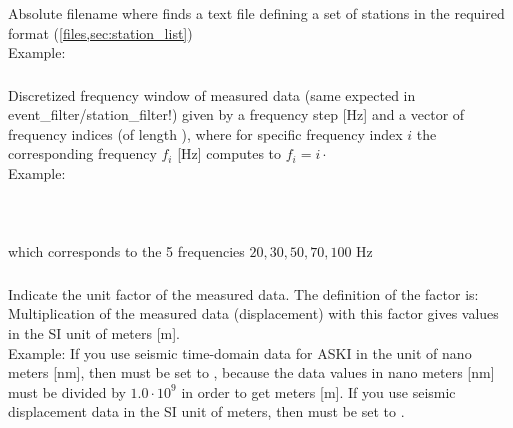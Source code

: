 \subsubsection{} \label{files,sec:main_parfile,itm:file_station_list}
Absolute filename where \ASKI finds a text file defining a set of stations in the required format 
(\ref{files,sec:station_list})\\
Example: 
\subsubsection{} 
\label{files,sec:main_parfile,itm:mdata_freq}
Discretized frequency window of measured data (same expected in event\_filter/station\_filter!) given by a frequency 
step  [Hz] and a vector of frequency indices 
(of length ), where for specific frequency index $i$ the corresponding frequency $f_i$ [Hz] 
computes to $f_i = i \cdot$ \\
Example:\\
\\
\\
\\
which corresponds to the 5 frequencies $20,30,50,70,100$ Hz
\subsubsection{} 
Indicate the unit factor of the measured data. The definition of the factor is:\\
Multiplication of the measured data (displacement) with this factor gives values in the SI unit of meters [m].\\
Example: If you use seismic time-domain data for ASKI in the unit of nano meters [nm], then 
must be set to  , because the data values in nano meters [nm] must be divided by $1.0\cdot 10^9$ in order to get meters [m].
If you use seismic displacement data in the SI unit of meters, then  must be set to .
